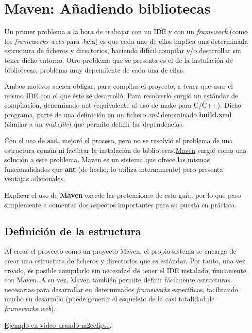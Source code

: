 \documentclass[11pt]{article}
\begin{document}
\section{Maven: Añadiendo bibliotecas} \label{sec-5} \label{maven}

Un primer problema a la hora de trabajar con un IDE y con un \emph{framework}
(como los \emph{frameworks webs} para Java) es que cada uno de ellos implica una
determinada estructura de ficheros y directorios, haciendo difícil compilar y/o
desarrollar sin tener dicho entorno. Otro problema que se presenta es el de la instalación de bibliotecas, problema muy dependiente de cada una de ellas.

Ambos motivos suelen obligar, para compilar el proyecto, a tener que usar el mismo IDE con el que éste se desarrolló. Para resolverlo surgió un estándar de compilación,
denominado \textsf{ant} (equivalente al uso de \textsf{make} para C/C++). Dicho
programa, parte de una definición en un fichero \emph{xml} denominado
\textbf{build.xml} (similar a un \textit{makefile}) que permite definir las dependencias.

Con el uso de \textbf{ant}, mejoró el proceso, pero no se resolvió el problema
de una estructura común ni facilitar la instalación de bibliotecas.\href{http://maven.apache.org/}{Maven} surgió como una solución a este problema. Maven es un sistema que ofrece las mismas funcionalidades que \textbf{ant} (de hecho, lo utiliza internamente) pero presenta ventajas adicionales.

Explicar el uso de \textbf{Maven} excede las pretensiones de esta guía, por lo
que paso simplemente a comentar dos aspectos importantes para su puesta en práctica.


\subsection{Definición de la estructura} \label{sec-5-1}

Al crear el proyecto como un proyecto Maven, el propio sistema se encarga de
crear una estructura de ficheros y directorios que es estándar. Por tanto, una
vez creado, es posible compilarlo sin necesidad de tener el IDE instalado,
únicamente con Maven. A su vez, Maven también permite definir
fácilmente estructuras necesarias para desarrollar en determinados
\emph{frameworks} específicos, facilitando mucho su desarrollo (puede generar el esqueleto
de la casi totalidad de \emph{frameworks web}).

\href{http://www.youtube.com/watch?v=5Tp3XCEfMGk}{Ejemplo en video usando
m2eclipse}.
\end{document}
